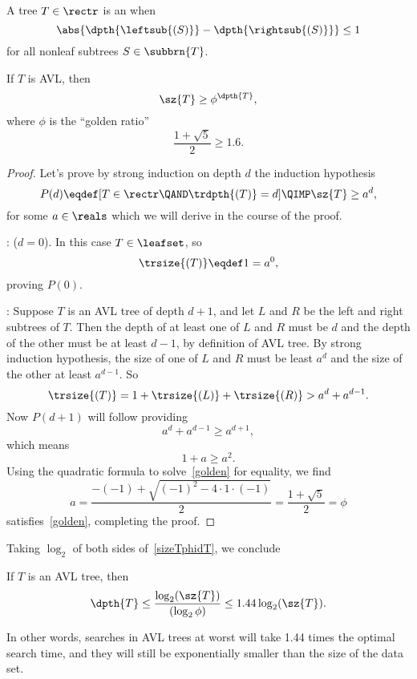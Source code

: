 \begin{definition}
\begin{definition}
A tree $T\in \rectr$ is an  when
\[
\abs{\dpth{\leftsub{(S)}} - \dpth{\rightsub{(S)}}} \leq 1
\]
for all nonleaf subtrees $S \in \subbrn{T}$.
\end{definition}


\begin{lemma}\label{avl_size}
If $T$ is AVL, then
\begin{equation}\label{sizeTphidT}
\sz{T} \geq \phi^{\dpth{T}}, 
\end{equation}
where $\phi$ is the ``golden ratio''
\[
\frac{1+\sqrt{5}}{2} \geq 1.6.
\]

\begin{proof}
Let's prove by strong induction on depth $d$ the induction hypothesis
\[
P(d) \eqdef [T \in \rectr \QAND \trdpth{(T)} = d] \QIMP \sz{T}
\geq a^d,
\]
for some $a \in \reals$ which we will derive in the course of the
proof.

: ($d=0$).
In this case $T \in \leafset$, so
\[
\trsize{(T)} \eqdef 1 = a^0,
\]
proving $P(0)$.

: Suppose $T$ is an AVL tree of depth
$d+1$, and let $L$ and $R$ be the left and right subtrees of $T$.
Then the depth of at least one of $L$ and $R$ must be $d$ and the
depth of the other must be at least $d-1$, by definition of AVL tree.
By strong induction hypothesis, the size of one of $L$ and $R$ must be
least $a^d$ and the size of the other at least $a^{d-1}$.  So
\[
\trsize{(T)}
  = 1 + \trsize{(L)} + \trsize{(R)}
  > a^d + a^{d-1}.
\]            
Now $P(d+1)$ will follow providing
\[
 a^d + a^{d-1} \geq a^{d+1},
\]
which means
\begin{equation}\label{golden}
1+a \geq a^2.
\end{equation}
Using the quadratic formula to solve~\eqref{golden} for equality, we find
\[
a = \frac{-(-1) + \sqrt{(-1)^2-4\cdot 1\cdot (-1)}}{2} = \frac{1 + \sqrt{5}}{2} = \phi
\]
satisfies~\eqref{golden}, completing the proof.
\end{proof}
\end{lemma}

Taking $\log_2$ of both sides of~\eqref{sizeTphidT}, we conclude
\begin{corollary}
If $T$ is an AVL tree, then
\[
\dpth{T} \leq \frac{\log_2(\sz{T})}{(\log_2 \phi)} \leq 1.44
\log_2(\sz{T}).
\]
\end{corollary}
In other words, searches in AVL trees at worst will take 1.44 times
the optimal search time, and they will still be exponentially smaller
than the size of the data set.


\end{definition}
